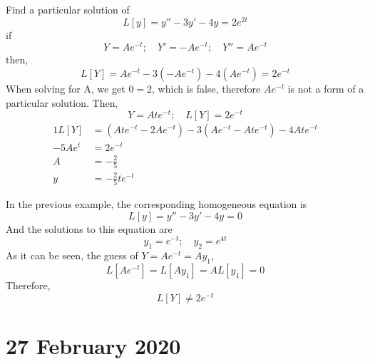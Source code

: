 \documentclass[twoside]{report}
\begin{document}
    \np
    \begin{example}
        Find a particular solution of
        \begin{equation}
            L[y] = y''- 3y' - 4y = 2e^{2t}
        \end{equation}
        if
        \begin{equation}
            Y = Ae^{-t};\quad Y' = -Ae^{-t};\quad Y'' = Ae^{-t}
        \end{equation}
        then,
        \begin{equation}
            L[Y] = Ae^{-t} - 3(-Ae^{-t}) - 4(Ae^{-t}) = 2e^{-t}
        \end{equation}
        When solving for A, we get $0 = 2$, which is false, therefore $Ae^{-t}$ is not a form of a particular solution.
        Then,
        \begin{equation}
            Y = Ate^{-t};\quad L[Y] = 2e^{-t}
        \end{equation}
        \begin{alignat}{1}
            L[Y] &= (Ate^{-t} - 2Ae^{-t})-3(Ae^{-t}-Ate^{-t}) - 4Ate^{-t}\\
            -5Ae^{t}&=2e^{-t}\\
            A &= -\frac{2}{5}\\
            y &= -\frac{2}{5}te^{-t}
        \end{alignat}
    \end{example}
    In the previous example, the corresponding homogeneous equation is
    \begin{equation}
        L[y] = y'' - 3y' - 4y = 0
    \end{equation}
    And the solutions to this equation are
    \begin{equation}
        y_{1} = e^{-t};\quad y_{2} = e^{4t}
    \end{equation}
    As it can be seen, the guess of $Y = Ae^{-t} = Ay_{1}$,
    \begin{equation}
        L[Ae^{-t}] = L[Ay_{1}] = AL[y_{1}] = 0
    \end{equation}
    Therefore,
    \begin{equation}
        L[Y] \neq 2e^{-t}
    \end{equation}
    \chapter{27 February 2020}
\end{document}
